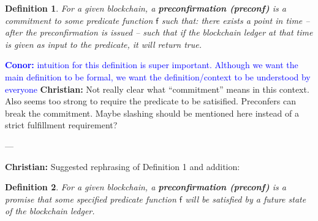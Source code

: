 \documentclass[a4paper]{article}
\theoremstyle{boldstyle}
\newtheorem{definitionx}{Definition}
\newenvironment{definition}
  {\begin{defopenboxq}\begin{definitionx}}
  {\end{definitionx}\end{defopenboxq}}
\newcommand{\cm}[1]{\textcolor{blue}{\textbf{Conor:} #1}}
\newcommand{\chm}[1]{\textcolor{OliveGreen}{\textbf{Christian:} #1}}
\begin{document}
    
    
    
    

        \begin{definition}
        \label{def:preconfer}
        For a given blockchain, a \textbf{preconfirmation (preconf)} is a commitment to some predicate function $\mathsf{f}$ such that: there exists a point in time -- after the preconfirmation is issued -- such that if the blockchain ledger at that time is given as input to the predicate, it will return true. 
        \end{definition}

        \cm{intuition for this definition is super important. Although we want the main definition to be formal, we want the definition/context to be understood by everyone} 
        \chm{Not really clear what ``commitment'' means in this context. Also seems too strong to require the predicate to be satisified. Preconfers can break the commitment. Maybe slashing should be mentioned here instead of a strict fulfillment requirement?}

        ---

        \chm{Suggested rephrasing of Definition 1 and addition:}
        \begin{definition}
            For a given blockchain, a \textbf{preconfirmation (preconf)} is a promise that some specified predicate function $\mathsf{f}$ will be satisfied by a future state of the blockchain ledger.
        \end{definition}
\end{document}
